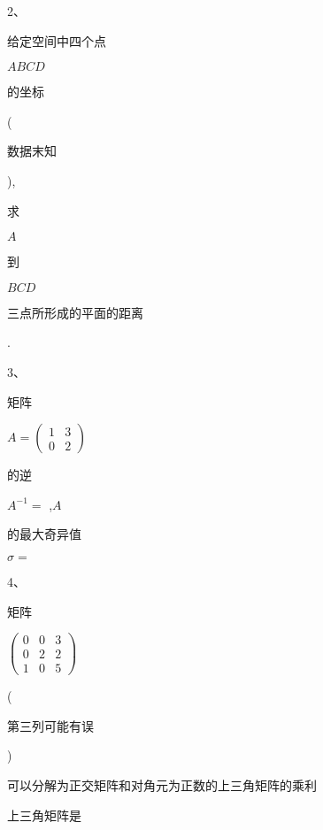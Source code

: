 \documentclass[10pt]{article}
\begin{document}
2、\begin{CJK}{UTF8}{mj}给定空间中四个点\end{CJK} $A B C D$ \begin{CJK}{UTF8}{mj}的坐标\end{CJK} (\begin{CJK}{UTF8}{mj}数据末知\end{CJK}), \begin{CJK}{UTF8}{mj}求\end{CJK} $A$ \begin{CJK}{UTF8}{mj}到\end{CJK} $B C D$ \begin{CJK}{UTF8}{mj}三点所形成的平面的距离\end{CJK}.

3、\begin{CJK}{UTF8}{mj}矩阵\end{CJK} $A=\left(\begin{array}{ll}1 & 3 \\ 0 & 2\end{array}\right)$ \begin{CJK}{UTF8}{mj}的逆\end{CJK} $A^{-1}=$ ,$A$ \begin{CJK}{UTF8}{mj}的最大奇异值\end{CJK} $\sigma=$

4、\begin{CJK}{UTF8}{mj}矩阵\end{CJK} $\left(\begin{array}{lll}0 & 0 & 3 \\ 0 & 2 & 2 \\ 1 & 0 & 5\end{array}\right)$

(\begin{CJK}{UTF8}{mj}第三列可能有误\end{CJK}) \begin{CJK}{UTF8}{mj}可以分解为正交矩阵和对角元为正数的上三角矩阵的乘利\end{CJK} \begin{CJK}{UTF8}{mj}上三角矩阵是\end{CJK}
\end{document}
